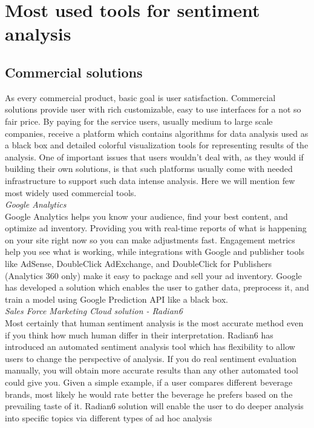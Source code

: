 \section{Most used tools for sentiment analysis}

\subsection*{Commercial solutions}
As every commercial product, basic goal is user satisfaction. Commercial solutions provide user with rich customizable, easy to use interfaces for a not so fair price. By paying for the service users, usually medium to large scale companies, receive a platform which contains algorithms for data analysis used as a black box and detailed colorful visualization tools for representing results of the analysis. One of important issues that users wouldn’t deal with, as they would if building their own solutions, is that such platforms usually come with needed infrastructure to support such data intense analysis. Here we will mention few most widely used commercial tools.\\
\textit{Google Analytics\\}
Google Analytics helps you know your audience, find your best content, and optimize ad inventory. Providing you with real-time reports of what is happening on your site right now so you can make adjustments fast. Engagement metrics help you see what is working, while integrations with Google and publisher tools like AdSense, DoubleClick AdExchange, and DoubleClick for Publishers (Analytics 360 only) make it easy to package and sell your ad inventory.  Google has developed a solution which enables the user to gather data, preprocess it, and train a model using Google Prediction API like a black box.\\
\textit{Sales Force Marketing Cloud solution - Radian6\\}
Most certainly that human sentiment analysis is the most accurate method even if you think how much human differ in their interpretation. Radian6 has introduced an automated sentiment analysis tool which has flexibility to allow users to change the perspective of analysis. If you do real sentiment evaluation manually, you will obtain more accurate results than any other automated tool could give you. Given a simple example, if a user compares different beverage brands, most likely he would rate better the beverage he prefers based on the prevailing taste of it. Radian6 solution will enable the user to do deeper analysis into specific topics via different types of ad hoc analysis
